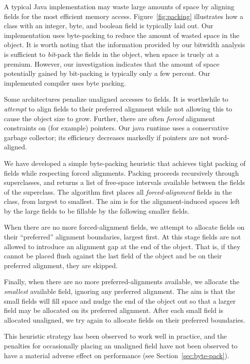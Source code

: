 \documentclass{acmconf}
\begin{document}
A typical Java implementation may waste large amounts of space by
aligning fields for the most efficient memory access.
Figure~\ref{fig:packing} illustrates how a class with an integer,
byte, and boolean field is typically laid out.  Our implementation
uses byte-packing to reduce the amount of wasted space in the object.
It is worth noting that the information provided by our bitwidth
analysis is sufficient to {\it bit}-pack the fields in the object,
when space is truely at a premium.  However, our investigation
indicates that the amount of space potentially gained by bit-packing 
is typically only a few percent.  Our implemented compiler uses byte
packing.

Some architectures penalize unaligned accesses to fields.  It is
worthwhile to {\it attempt} to align fields to their preferred
alignment while not allowing this to cause the object size to grow.
Further, there are often {\it forced} alignment constraints on
(for example) pointers.  Our java runtime uses a conservative garbage
collector; its efficiency decreases markedly if pointers are not
word-aligned.

We have developed a simple byte-packing heuristic that achieves
tight packing of fields while respecting forced alignments.  Packing
proceeds recursively through superclasses, and returns a list of
free-space intervals available between the fields of the superclass.
The algorithm first places all {\it forced-alignment} fields in
the class, from largest to smallest.  The aim is for the
alignment-induced spaces left by the large fields to be fillable by
the following smaller fields.

When there are no more forced-alignment fields, we attempt to allocate
fields on their ``preferred'' alignment boundaries, largest first.
At this stage fields are not allowed to introduce an alignment gap at
the end of the object.  That is, if they cannot be placed flush
against the last field of the object and be on their preferred
alignment, they are skipped.

Finally, when there are no more preferred-alignments available, we
allocate the {\it smallest} available field, ignoring any preferred
alignment.  The aim is that the small fields will fill space and nudge
the end of the object out so that a larger field may be allocated on
its preferred alignment.  After each small field is allocated
unaligned, we try again to allocate fields on their preferred
boundaries.

This heuristic strategy has been observed to work well in practice,
and the penalties for occasionally placing an unaligned field have not
been observed to have a material adverse effect on performance (see
Section~\ref{sec:byte-pack}). 
\end{document}
